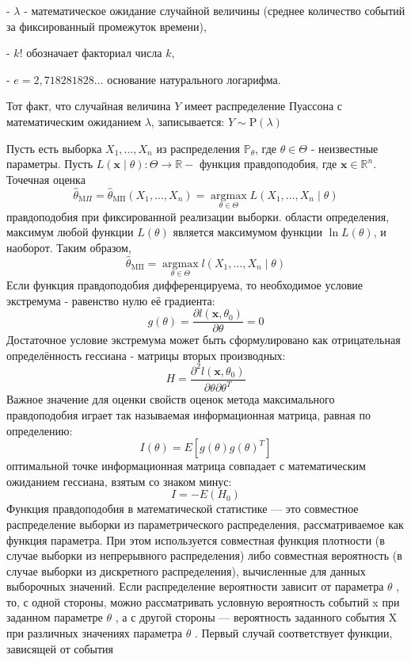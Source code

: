 \documentclass[a4paper, 12pt]{article}
\begin{document}
	- $\lambda$ - математическое ожидание случайной величины (среднее количество событий за фиксированный промежуток времени),
	
	- $k !$ обозначает факториал числа $k$,
	
	- $e=2,718281828 \ldots$ основание натурального логарифма.
	
	Тот факт, что случайная величина $Y$ имеет распределение Пуассона с математическим ожиданием $\lambda$, записывается:
	$Y \sim \mathrm{P}(\lambda)$
	
	
	Пусть есть выборка $X_{1}, \ldots, X_{n}$ из распределения $\mathbb{P}_{\theta}$, где $\theta \in \Theta$ - неизвестные параметры. Пусть $L(\mathbf{x} \mid \theta): \Theta \rightarrow \mathbb{R}-$ функция правдоподобия, где $\mathbf{x} \in \mathbb{R}^{n}$. Точечная оценка $$\hat{\theta}_{\mathrm{M} \Pi}=\hat{\theta}_{\mathrm{M\Pi}}\left(X_{1}, \ldots, X_{n}\right)=\underset{\theta \in \Theta}{\operatorname{argmax}} L\left(X_{1}, \ldots, X_{n} \mid \theta\right)$$
	правдоподобия при фиксированной реализации выборки.
	области определения, максимум любой функции $L(\theta)$ является максимумом функции $\ln L(\theta)$, и наоборот. Таким образом, $$\hat{\theta}_{\mathrm{M\Pi}}=\underset{\theta \in \Theta}{\operatorname{argmax}} l\left(X_{1}, \ldots, X_{n} \mid \theta\right)$$
	Если функция правдоподобия дифференцируема, то необходимое условие экстремума - равенство нулю её градиента:
	$$g(\theta)=\frac{\partial l\left(\mathbf{x}, \theta_{0}\right)}{\partial \theta}=0$$
	Достаточное условие экстремума может быть сформулировано как отрицательная определённость гессиана - матрицы вторых производных:
	$$H=\frac{\partial^{2} l\left(\mathbf{x}, \theta_{0}\right)}{\partial \theta \partial \theta^{T}}$$
	Важное значение для оценки свойств оценок метода максимального правдоподобия играет так называемая информационная матрица, равная по определению:
	$$I(\theta)=E\left[g(\theta) g(\theta)^{T}\right]$$
	оптимальной точке информационная матрица совпадает с математическим ожиданием гессиана, взятым со знаком минус:
	$$I=-E\left(H_{0}\right)$$
	Функция правдоподобия в математической статистике — это совместное распределение выборки из параметрического распределения, рассматриваемое как функция параметра. При этом используется совместная функция плотности (в случае выборки из непрерывного распределения) либо совместная вероятность (в случае выборки из дискретного распределения), вычисленные для данных выборочных значений.
	Если распределение вероятности зависит от параметра 
	$\theta$ , то, с одной стороны, можно рассматривать условную вероятность событий 
	x при заданном параметре
	$\theta$ , а с другой стороны — вероятность заданного события 
	X при различных значениях параметра 
	$\theta$ . Первый случай соответствует функции, зависящей от события 
	
\end{document}
